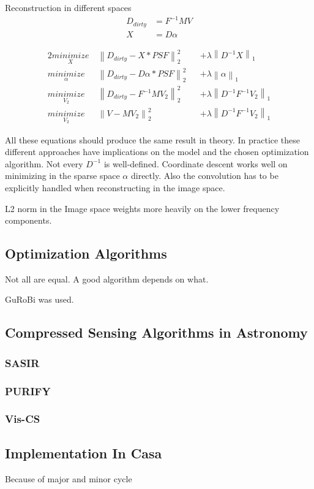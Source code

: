 Reconstruction in different spaces
\begin{equation}
\begin{split}
D_{dirty} &= F^{-1}MV \\
X &= D\alpha
\end{split}
\end{equation}

\begin{alignat*}{2}
	\underset{X}{minimize} \:& \left \| D_{dirty} - X \ast PSF \right \|_2^2 &&+  \lambda \left \| D^{-1}X \right \|_1 \\
	\underset{\alpha}{minimize} \:& \left \| D_{dirty} - D\alpha \ast PSF \right \|_2^2 &&+ \lambda \left \| \alpha \right \|_1 \\
	\underset{V_2}{minimize} \:& \left \| D_{dirty} - F^{-1} M V_2 \right \|_2^2 &&+ \lambda \left \| D^{-1}F^{-1}V_2\right \|_1 \\
	\underset{V_2}{minimize} \:& \left \| V - M V_2 \right \|_2^2 &&+ \lambda \left \| D^{-1}F^{-1}V_2\right \|_1
\end{alignat*}

All these equations should produce the same result in theory. In practice these different approaches have implications on the model and the chosen optimization algorithm. Not every $D^{-1}$ is well-defined. Coordinate descent works well on minimizing in the sparse space $\alpha$ directly. Also the convolution has to be explicitly handled when reconstructing in the image space.

L2 norm in the Image space weights more heavily on the lower frequency components.

\subsection{Optimization Algorithms}

Not all are equal. A good algorithm depends on what.

GuRoBi was used.


\subsection{Compressed Sensing Algorithms in Astronomy}

\subsubsection{SASIR}

\subsubsection{PURIFY}

\subsubsection{Vis-CS}



\subsection{Implementation In Casa}

Because of major and minor cycle
